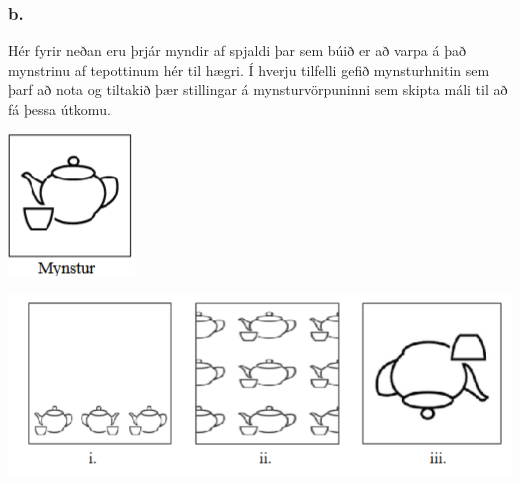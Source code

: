 \documentclass{article}
\begin{document}
\subsubsection{b.}Hér fyrir neðan eru þrjár myndir af spjaldi þar sem búið er að
varpa á það mynstrinu af tepottinum hér til hægri. Í hverju
tilfelli gefið mynsturhnitin sem þarf að nota og tiltakið þær
stillingar á mynsturvörpuninni sem skipta máli til að fá þessa
útkomu.

\includegraphics[scale = 0.9]{mynstur.png}

\begin{center}
\includegraphics[scale = 0.9]{mynstur2.png}
\end{center}
\end{document}
